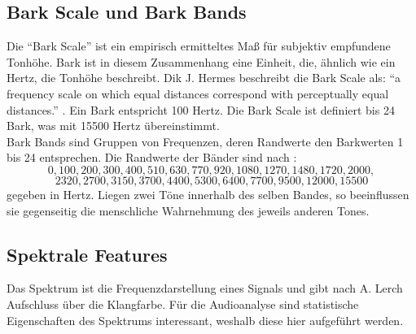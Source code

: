\documentclass[11pt,a4paper]{article}
\begin{document}
\subsection{Bark Scale und Bark Bands}
Die ``Bark Scale'' ist ein empirisch ermitteltes Maß für subjektiv empfundene Tonhöhe. Bark ist in diesem Zusammenhang eine Einheit, die, ähnlich wie ein Hertz, die Tonhöhe beschreibt. Dik J. Hermes beschreibt die Bark Scale als: ``a frequency scale on which equal distances correspond with perceptually equal distances.'' \cite{BBands}. Ein Bark entspricht 100 Hertz. Die Bark Scale ist definiert bis 24 Bark, was mit 15500 Hertz übereinstimmt.\\
Bark Bands sind Gruppen von Frequenzen, deren Randwerte den Barkwerten 1 bis 24 entsprechen. Die Randwerte der Bänder sind nach \cite[S. 3]{smith1999bark}:
\[0, 100, 200, 300, 400, 510, 630, 770, 920, 1080, 1270, 1480, 1720, 2000, \]
\[2320, 2700, 3150, 3700, 4400, 5300, 6400, 7700, 9500, 12 000, 15 500\]
gegeben in Hertz. Liegen zwei Töne innerhalb des selben Bandes, so beeinflussen sie gegenseitig die menschliche Wahrnehmung des jeweils anderen Tones.

\subsection{Spektrale Features}
\label{sec:GrundlagenSpektraleFeatures}
Das Spektrum ist die Frequenzdarstellung eines Signals und gibt nach A. Lerch \cite[S. 41]{lerch2012introduction} Aufschluss über die Klangfarbe. Für die Audioanalyse sind statistische Eigenschaften des Spektrums interessant, weshalb diese hier aufgeführt werden.
\end{document}
